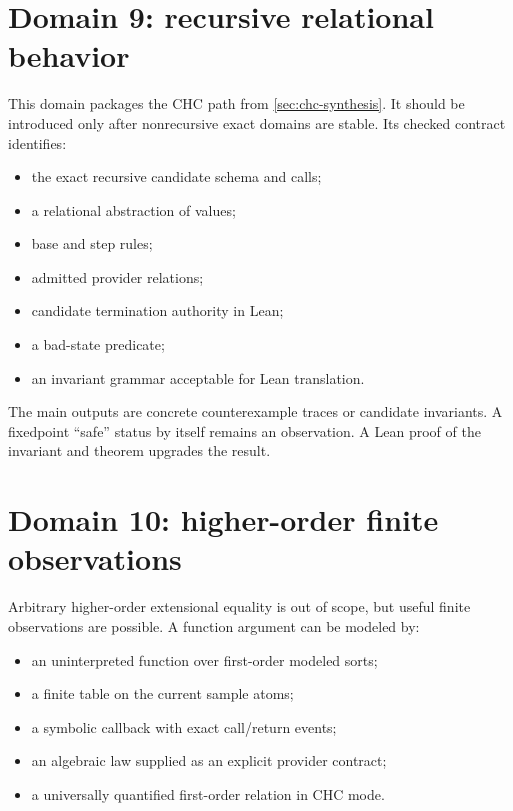 \documentclass[11pt,oneside]{report}
\begin{document}
\section{Domain 9: recursive relational behavior}
\label{sec:domain-recursive}

This domain packages the CHC path from \cref{sec:chc-synthesis}. It should be introduced only after nonrecursive exact domains are stable. Its checked contract identifies:

\begin{itemize}[leftmargin=2em]
\item the exact recursive candidate schema and calls;
\item a relational abstraction of values;
\item base and step rules;
\item admitted provider relations;
\item candidate termination authority in Lean;
\item a bad-state predicate;
\item an invariant grammar acceptable for Lean translation.
\end{itemize}

The main outputs are concrete counterexample traces or candidate invariants. A fixedpoint ``safe'' status by itself remains an observation. A Lean proof of the invariant and theorem upgrades the result.

\section{Domain 10: higher-order finite observations}
\label{sec:domain-higher-order}

Arbitrary higher-order extensional equality is out of scope, but useful finite observations are possible. A function argument can be modeled by:

\begin{itemize}[leftmargin=2em]
\item an uninterpreted function over first-order modeled sorts;
\item a finite table on the current sample atoms;
\item a symbolic callback with exact call/return events;
\item an algebraic law supplied as an explicit provider contract;
\item a universally quantified first-order relation in CHC mode.
\end{itemize}
\end{document}
